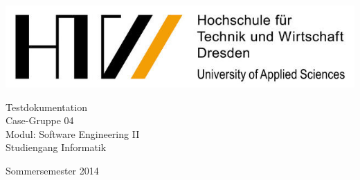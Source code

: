 \documentclass[a4paper,oneside,titlepage,12pt]{article}
\begin{document}
\begin{titlepage}
	\includegraphics{grafiken/HTW-Logo.png}
	\vspace*{3cm}
	\begin{center}
		\Huge{Testdokumentation\\} \vspace*{1cm}
		\huge{Case-Gruppe 04\\}
		\vspace*{1cm}
		\Large{
			Modul: Software Engineering II\\}
		\vspace*{2cm}
		\normalsize{
			Studiengang Informatik\\
		}
	\end{center}
	\vspace{2cm}
\begin{center}
\large{Sommersemester 2014}
\end{center}
	\vspace*{3cm}

\end{titlepage}

\thispagestyle{empty}\clearpage

\newtheorem{satz}{Satz}
\newtheorem{lemma}[satz]{Lemma}
\newtheorem{folgerung}[satz]{Folgerung}
\theoremstyle{definition}
\newtheorem{definition}[satz]{Definition}
\renewcommand{\proofname}{Beweis}

\setcounter{page}{3} 
\setcounter{tocdepth}{1}
\tableofcontents
{} 
\setcounter{roemisch}{\value{page}}
\clearpage

\setcounter{page}{2} 
\end{document}
